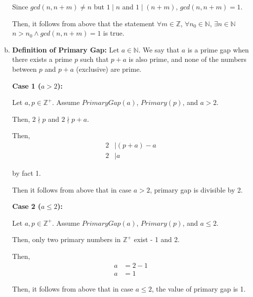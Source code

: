 \documentclass[12pt]{article}
\begin{document}
\begin{enumerate}[a.]
    Since $gcd(n,n+m) \neq n$ but $1 \mid n$ and $1 \mid (n+m)$, $gcd(n,n+m)=1$.

    \bigskip

    Then, it follows from above that the statement $\forall m \in \mathbb{Z}$,
    $\forall n_0 \in \mathbb{N}$, $\exists n \in \mathbb{N}$ $n > n_0 \land
    gcd(n, n+m) = 1$ is true.

    \item

    \textbf{Definition of Primary Gap:} Let $a \in \mathbb{N}$. We say that $a$
    is a prime gap when there exists a prime $p$ such that $p+a$ is also prime,
    and none of the numbers between $p$ and $p + a$ (exclusive) are prime.

    \bigskip

    \textbf{Case 1 ($a > 2$):}

    \bigskip

    Let $a,p \in \mathbb{Z}^{+}$. Assume $PrimaryGap(a)$, $Primary(p)$, and $a > 2$.

    \bigskip

    Then, $2 \nmid p$ and $2 \nmid p + a$.

    \bigskip

    Then,
    \setcounter{equation}{0}
    \begin{align}
        2 &\mid (p + a) - a\\
        2 &\mid a
    \end{align}

    by fact 1.

    \bigskip

    Then it follows from above that in case $a > 2$, primary gap is divisible by
    2.

    \bigskip

    \textbf{Case 2 ($a \leq 2$):}

    \bigskip

    Let $a,p \in \mathbb{Z}^{+}$. Assume $PrimaryGap(a)$, $Primary(p)$, and
    $a \leq 2$.

    \bigskip

    Then, only two primary numbers in $\mathbb{Z}^{+}$ exist - 1 and 2.

    \bigskip

    Then,
    \setcounter{equation}{0}
    \begin{align}
        a &= 2 - 1\\
        a &= 1
    \end{align}

    \bigskip

    Then, it follows from above that in case $a \leq 2$, the value of primary gap
    is 1.

\end{enumerate}
\end{document}
